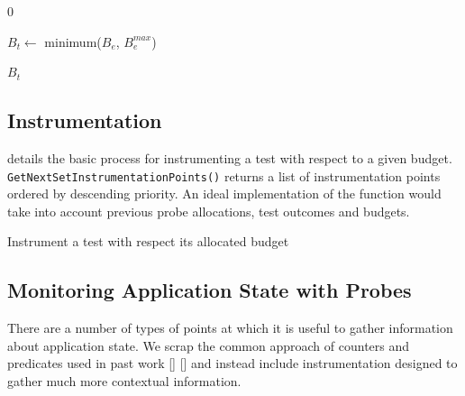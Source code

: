 {\begin{algorithm}[H]
\begin{algorithmic}[1]
	\EndFunction
	\Statex


		\Return $0$
	\EndIf

	\State $B_t \gets$ minimum($B_e$, $B_{e}^{max}$)

	\State \Return $B_t$

	\EndFunction
\end{algorithmic}

\end{algorithm}


\subsection{Instrumentation}

 details the basic process for instrumenting a test
with respect to a given budget. {\tt GetNextSetInstrumentationPoints()} returns
a list of instrumentation points ordered by descending priority. An ideal
implementation of the function would take into account previous probe
allocations, test outcomes and budgets.

\begin{algorithm}[H]
\caption{Instrument a test with respect its allocated budget}
\label{alg:instrument_test}

\begin{algorithmic}
	\Statex


			\Else
			\EndIf
		\EndFor
	\EndWhile

	\EndFunction
\end{algorithmic}

\end{algorithm}


\subsection{Monitoring Application State with Probes}
\label{sec:probes}

There are a number of types of points at which it is useful to gather
information about application state. We scrap the common approach of counters
and predicates used in past work [] [] and instead include instrumentation
designed to gather much more contextual information.

}
